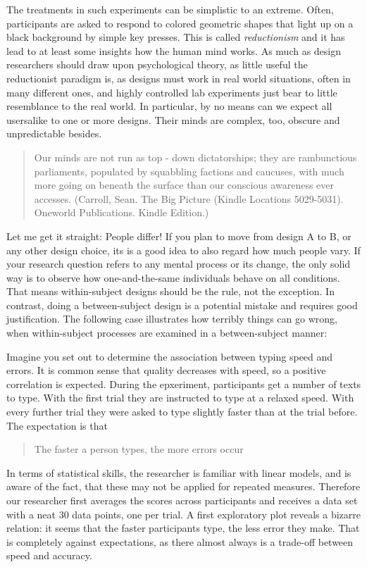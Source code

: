 \documentclass[]{svmono}
\theoremstyle{definition}
\theoremstyle{definition}
\theoremstyle{definition}
\theoremstyle{remark}
\begin{document}
The treatments in such experiments can be simplistic to an extreme.
Often, participants are asked to respond to colored geometric shapes
that light up on a black background by simple key presses. This is
called \emph{reductionism} and it has lead to at least some insights how
the human mind works. As much as design researchers should draw upon
psychological theory, as little useful the reductionist paradigm is, as
designs must work in real world situations, often in many different
ones, and highly controlled lab experiments just bear to little
resemblance to the real world. In particular, by no means can we expect
all usersalike to one or more designs. Their minds are complex, too,
obscure and unpredictable besides.

\begin{quote}
Our minds are not run as top - down dictatorships; they are rambunctious
parliaments, populated by squabbling factions and caucuses, with much
more going on beneath the surface than our conscious awareness ever
accesses. (Carroll, Sean. The Big Picture (Kindle Locations 5029-5031).
Oneworld Publications. Kindle Edition.)
\end{quote}

Let me get it straight: People differ! If you plan to move from design A
to B, or any other design choice, its is a good idea to also regard how
much people vary. If your research question refers to any mental process
or its change, the only solid way is to observe how one-and-the-same
individuals behave on all conditions. That means within-subject designs
should be the rule, not the exception. In contrast, doing a
between-subject design is a potential mistake and requires good
justification. The following case illustrates how terribly things can go
wrong, when within-subject processes are examined in a between-subject
manner:

Imagine you set out to determine the association between typing speed
and errors. It is common sense that quality decreases with speed, so a
positive correlation is expected. During the epxeriment, participants
get a number of texts to type. With the first trial they are instructed
to type at a relaxed speed. With every further trial they were asked to
type slightly faster than at the trial before. The expectation is that

\begin{quote}
The faster a person types, the more errors occur
\end{quote}

In terms of statistical skills, the researcher is familiar with linear
models, and is aware of the fact, that these may not be applied for
repeated measures. Therefore our researcher first averages the scores
across participants and receives a data set with a neat 30 data points,
one per trial. A first exploratory plot reveals a bizarre relation: it
seems that the faster participants type, the less error they make. That
is completely against expectations, as there almost always is a
trade-off between speed and accuracy.
\end{document}
